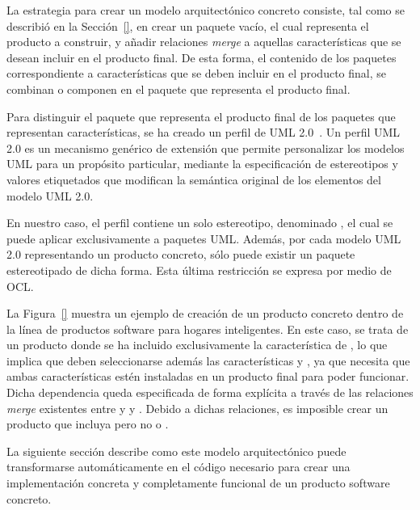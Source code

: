 
La estrategia para crear un modelo arquitectónico concreto consiste, tal como se describió en la Sección~\ref{}, en crear un paquete vacío, el cual representa el producto a construir, y añadir relaciones \emph{merge} a aquellas características que se desean incluir en el producto final. De esta forma, el contenido de los paquetes correspondiente a características que se deben incluir en el producto final, se combinan o componen en el paquete que representa el producto final. 

Para distinguir el paquete que representa el producto final de los paquetes que representan características, se ha creado un perfil de UML 2.0~\citep{}. Un perfil UML 2.0 es un mecanismo genérico de extensión que permite personalizar los modelos UML para un propósito particular, mediante la especificación de estereotipos y valores etiquetados que modifican la semántica original de los elementos del modelo UML 2.0.  

En nuestro caso, el perfil contiene un solo estereotipo, denominado , el cual se puede aplicar exclusivamente a paquetes UML. Además, por cada modelo UML 2.0 representando un producto concreto, sólo puede existir un paquete estereotipado de dicha forma. Esta última restricción se expresa por medio de OCL. 
 
La Figura~\ref{} muestra un ejemplo de creación de un producto concreto dentro de la línea de productos software para hogares inteligentes. En este caso, se trata de un producto donde se ha incluido exclusivamente la característica de , lo que implica que deben seleccionarse además las características  y , ya que  necesita que ambas características estén instaladas en un producto final para poder funcionar. Dicha dependencia queda especificada de forma explícita a través de las relaciones \emph{merge} existentes entre  y  y . Debido a dichas relaciones, es imposible crear un producto que incluya  pero no  o .


La siguiente sección describe como este modelo arquitectónico puede transformarse automáticamente en el código necesario para crear una implementación concreta y completamente funcional de un producto software concreto.


